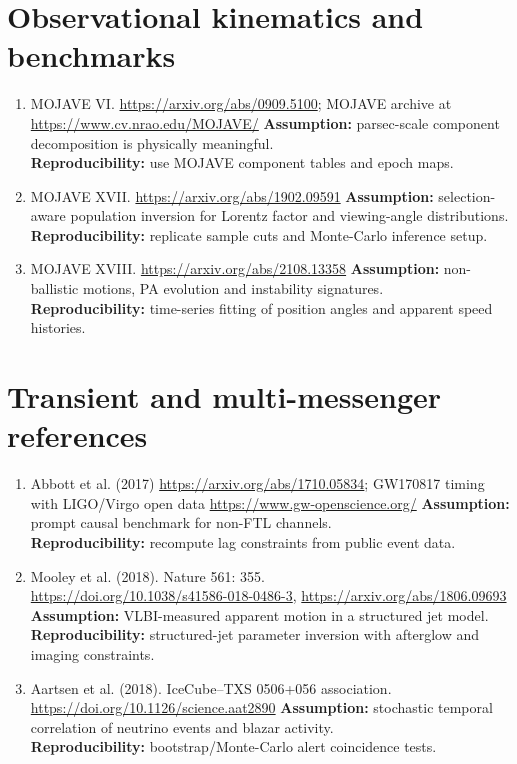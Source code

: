 \documentclass[11pt]{article}
\begin{document}
\section{Observational kinematics and benchmarks}
\begin{enumerate}
\item MOJAVE VI. \url{https://arxiv.org/abs/0909.5100}; MOJAVE archive at \url{https://www.cv.nrao.edu/MOJAVE/}
\textbf{Assumption:} parsec-scale component decomposition is physically meaningful.\\
\textbf{Reproducibility:} use MOJAVE component tables and epoch maps.

\item MOJAVE XVII. \url{https://arxiv.org/abs/1902.09591}
\textbf{Assumption:} selection-aware population inversion for Lorentz factor and viewing-angle distributions.\\
\textbf{Reproducibility:} replicate sample cuts and Monte-Carlo inference setup.

\item MOJAVE XVIII. \url{https://arxiv.org/abs/2108.13358}
\textbf{Assumption:} non-ballistic motions, PA evolution and instability signatures.\\
\textbf{Reproducibility:} time-series fitting of position angles and apparent speed histories.
\end{enumerate}

\section{Transient and multi-messenger references}
\begin{enumerate}
\item Abbott et al. (2017) \url{https://arxiv.org/abs/1710.05834}; GW170817 timing with LIGO/Virgo open data \url{https://www.gw-openscience.org/}
\textbf{Assumption:} prompt causal benchmark for non-FTL channels.\\
\textbf{Reproducibility:} recompute lag constraints from public event data.

\item Mooley et al. (2018). Nature 561: 355.\\
\url{https://doi.org/10.1038/s41586-018-0486-3}, \url{https://arxiv.org/abs/1806.09693}
\textbf{Assumption:} VLBI-measured apparent motion in a structured jet model.\\
\textbf{Reproducibility:} structured-jet parameter inversion with afterglow and imaging constraints.

\item Aartsen et al. (2018). IceCube--TXS 0506+056 association.\\
\url{https://doi.org/10.1126/science.aat2890}
\textbf{Assumption:} stochastic temporal correlation of neutrino events and blazar activity.\\
\textbf{Reproducibility:} bootstrap/Monte-Carlo alert coincidence tests.
\end{enumerate}
\end{document}
